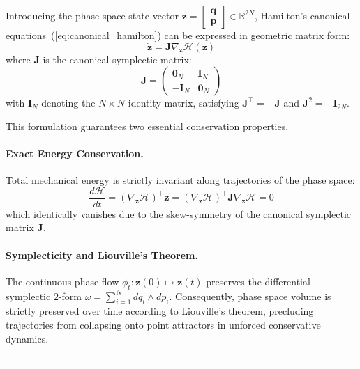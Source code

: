 \documentclass[11pt]{article}
\begin{document}
Introducing the phase space state vector $\mathbf{z} = \begin{bmatrix} \mathbf{q} \\ \mathbf{p} \end{bmatrix} \in \mathbb{R}^{2N}$, Hamilton's canonical equations~(\ref{eq:canonical_hamilton}) can be expressed in geometric matrix form:
\begin{equation}
\label{eq:hamilton_matrix}
    \dot{\mathbf{z}} = \mathbf{J} \nabla_\mathbf{z} \mathcal{H}(\mathbf{z})
\end{equation}
where $\mathbf{J}$ is the canonical symplectic matrix:
\begin{equation}
    \mathbf{J} = \begin{pmatrix} \mathbf{0}_N & \mathbf{I}_N \\ -\mathbf{I}_N & \mathbf{0}_N \end{pmatrix}
\end{equation}
with $\mathbf{I}_N$ denoting the $N \times N$ identity matrix, satisfying $\mathbf{J}^\top = -\mathbf{J}$ and $\mathbf{J}^2 = -\mathbf{I}_{2N}$.

This formulation guarantees two essential conservation properties.

\paragraph{Exact Energy Conservation.} Total mechanical energy is strictly invariant along trajectories of the phase space:
\begin{equation}
    \frac{d\mathcal{H}}{dt} = \left(\nabla_\mathbf{z} \mathcal{H}\right)^\top \dot{\mathbf{z}} = \left(\nabla_\mathbf{z} \mathcal{H}\right)^\top \mathbf{J} \nabla_\mathbf{z} \mathcal{H} = 0
\end{equation}
which identically vanishes due to the skew-symmetry of the canonical symplectic matrix $\mathbf{J}$.

\paragraph{Symplecticity and Liouville's Theorem.} The continuous phase flow $\phi_t : \mathbf{z}(0) \mapsto \mathbf{z}(t)$ preserves the differential symplectic 2-form $\omega = \sum_{i=1}^N dq_i \wedge dp_i$. Consequently, phase space volume is strictly preserved over time according to Liouville's theorem, precluding trajectories from collapsing onto point attractors in unforced conservative dynamics.

---
\end{document}
